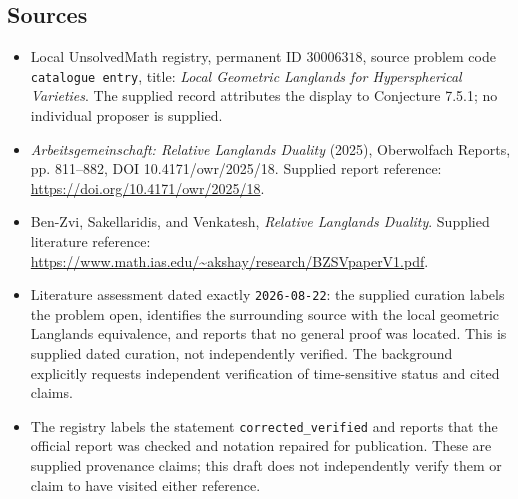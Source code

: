 \documentclass[11pt]{article}
\begin{document}
\subsection{Sources}
\begin{itemize}
\item Local UnsolvedMath registry, permanent ID \(30006318\), source problem code \texttt{catalogue entry}, title: \emph{Local Geometric Langlands for Hyperspherical Varieties}. The supplied record attributes the display to Conjecture 7.5.1; no individual proposer is supplied.
\item \emph{Arbeitsgemeinschaft: Relative Langlands Duality} (2025), Oberwolfach Reports, pp. 811--882, DOI 10.4171/owr/2025/18. Supplied report reference: \url{https://doi.org/10.4171/owr/2025/18}.
\item Ben-Zvi, Sakellaridis, and Venkatesh, \emph{Relative Langlands Duality}. Supplied literature reference: \url{https://www.math.ias.edu/~akshay/research/BZSVpaperV1.pdf}.
\item Literature assessment dated exactly \texttt{2026-08-22}: the supplied curation labels the problem open, identifies the surrounding source with the local geometric Langlands equivalence, and reports that no general proof was located. This is supplied dated curation, not independently verified. The background explicitly requests independent verification of time-sensitive status and cited claims.
\item The registry labels the statement \texttt{corrected\_verified} and reports that the official report was checked and notation repaired for publication. These are supplied provenance claims; this draft does not independently verify them or claim to have visited either reference.
\end{itemize}
\end{document}
